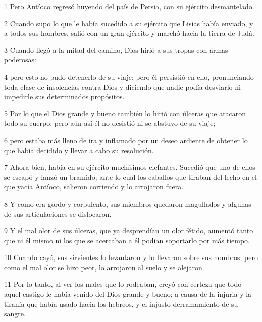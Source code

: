 \par 1 Pero Antíoco regresó huyendo del país de Persia, con su ejército desmantelado.

\par 2 Cuando supo lo que le había sucedido a su ejército que Lisias había enviado, y a todos sus hombres, salió con un gran ejército y marchó hacia la tierra de Judá.

\par 3 Cuando llegó a la mitad del camino, Dios hirió a sus tropas con armas poderosas:

\par 4 pero esto no pudo detenerlo de su viaje; pero él persistió en ello, pronunciando toda clase de insolencias contra Dios y diciendo que nadie podía desviarlo ni impedirle sus determinados propósitos.

\par 5 Por lo que el Dios grande y bueno también lo hirió con úlceras que atacaron todo su cuerpo; pero aún así él no desistió ni se abstuvo de su viaje;

\par 6 pero estaba más lleno de ira y inflamado por un deseo ardiente de obtener lo que había decidido y llevar a cabo su resolución.

\par 7 Ahora bien, había en su ejército muchísimos elefantes. Sucedió que uno de ellos se escapó y lanzó un bramido; ante lo cual los caballos que tiraban del lecho en el que yacía Antíoco, salieron corriendo y lo arrojaron fuera.

\par 8 Y como era gordo y corpulento, sus miembros quedaron magullados y algunas de sus articulaciones se dislocaron.

\par 9 Y el mal olor de sus úlceras, que ya desprendían un olor fétido, aumentó tanto que ni él mismo ni los que se acercaban a él podían soportarlo por más tiempo.

\par 10 Cuando cayó, sus sirvientes lo levantaron y lo llevaron sobre sus hombros; pero como el mal olor se hizo peor, lo arrojaron al suelo y se alejaron.

\par 11 Por lo tanto, al ver los males que lo rodeaban, creyó con certeza que todo aquel castigo le había venido del Dios grande y bueno; a causa de la injuria y la tiranía que había usado hacia los hebreos, y el injusto derramamiento de su sangre.

